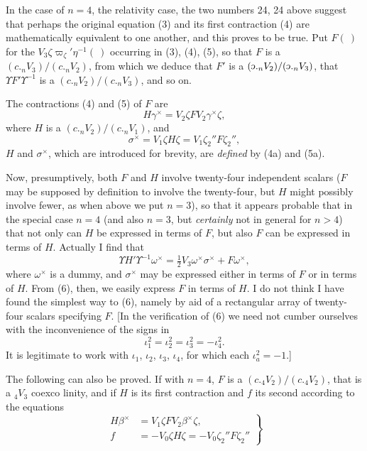 \documentclass[11pt]{article}
\newcommand{\invc}{\mathord{\rotatebox[origin=c]{180}{$c$}}}
\newcommand{\invc}{\mathord{\text{\invcfont ɔ}}}
\begin{document}
\indent In the case of $n=4$, the relativity case, the two numbers 24, 24 above suggest that perhaps the original equation (3) and its first contraction (4) are mathematically equivalent to one another, and this proves to be true. Put $F(\ )$ for the $V_3\zeta\varpi_\zeta'\eta^{-1}(\ )$ occurring in (3), (4), (5), so that $F$ is a $(c.{}_nV_3)/(c.{}_nV_2)$, from which we deduce that $F'$ is a $(\invc.{}_nV_2)/(\invc.{}_nV_3)$, that $\Upsilon F'\Upsilon^{-1}$ is a $(c.{}_nV_2)/(c.{}_nV_3)$, and so on.

\indent The contractions (4) and (5) of $F$ are
\[
  H\gamma^\times=V_2\zeta FV_2\gamma^\times\zeta,
  \tag{4a}
\]
where $H$ is a $(c.{}_nV_2)/(c.{}_nV_1)$, and
\[
  \sigma^\times=V_1\zeta H\zeta=V_1\zeta_2''F\zeta_2'',
  \tag{5a}
\]
$H$ and $\sigma^\times$, which are introduced for brevity, are \emph{defined} by (4a) and (5a).

\indent Now, presumptively, both $F$ and $H$ involve twenty-four independent scalars ($F$ may be supposed by definition to involve the twenty-four, but $H$ might possibly involve fewer, as when above we put $n=3$), so that it appears probable that in the special case $n=4$ (and also $n=3$, but \emph{certainly} not in general for $n>4$) that not only can $H$ be expressed in terms of $F$, but also $F$ can be expressed in terms of $H$. Actually I find that
\[
  \Upsilon H'\Upsilon^{-1}\omega^\times=\tfrac12V_3\omega^\times\sigma^\times+F\omega^\times,
  \tag{6}
\]
where $\omega^\times$ is a dummy, and $\sigma^\times$ may be expressed either in terms of $F$ or in terms of $H$. From (6), then, we easily express $F$ in terms of $H$. I do not think I have found the simplest way to (6), namely by aid of a rectangular array of twenty-four scalars specifying $F$. [In the verification of (6) we need not cumber ourselves with the inconvenience of the signs in
\[
  \iota_1^2=\iota_2^2=\iota_3^2=-\iota_4^2.
\]
It is legitimate to work with $\iota_1$, $\iota_2$, $\iota_3$, $\iota_4$, for which each $\iota_a^2=-1$.]

\indent The following can also be proved. If with $n=4$, $F$ is a $(c.{}_4V_2)/(c.{}_4V_2)$, that is a ${}_4V_3$ coexco linity, and if $H$ is its first contraction and $f$ its second according to the equations
\[
  \left.\begin{aligned}
    H\beta^\times&=V_1\zeta FV_2\beta^\times\zeta,\\
    f&=-V_0\zeta H\zeta=-V_0\zeta_2''F\zeta_2''
  \end{aligned}\right\}
  \tag{7}
\]
\end{document}
